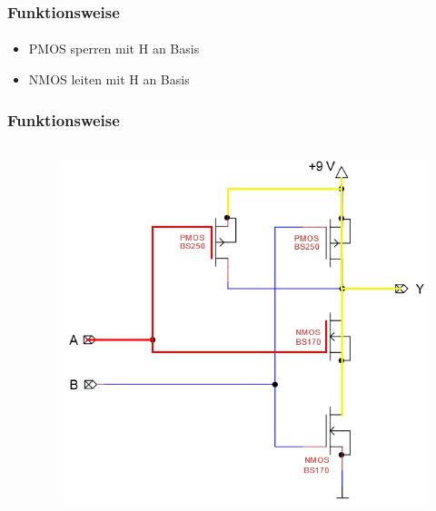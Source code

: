 \begin{frame}
    \frametitle{Funktionsweise}
    \framesubtitle{}
    \begin{block}{}
        \begin{itemize}
            \item PMOS sperren mit H an Basis
            \item NMOS leiten mit H an Basis
        \end{itemize}
    \end{block}
\end{frame}
\begin{frame}
    \frametitle{Funktionsweise}
    \framesubtitle{}
    \begin{columns}[c]
            \begin{center}
            \end{center}
            \begin{figure}[H]
            \begin{center}
                    \includegraphics[scale=0.5]{./img/schaltung/cmos_fun_10.png}
            \end{center}
            \end{figure}    
    \end{columns}
\end{frame}
